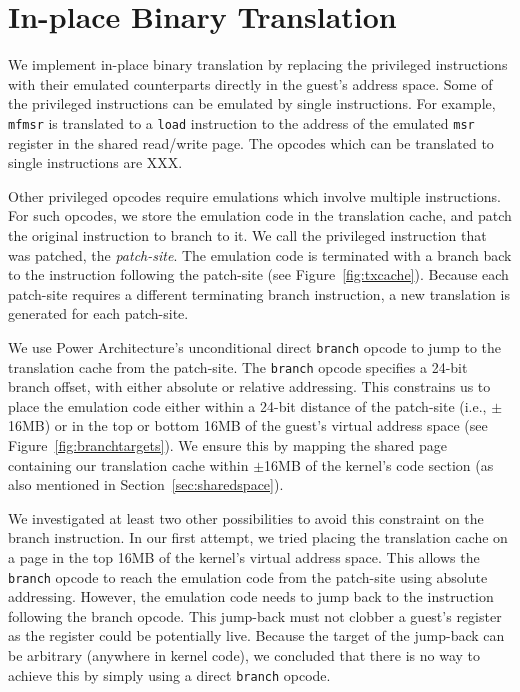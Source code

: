 \documentclass[10pt,twocolumn]{article}
\begin{document}
\section{In-place Binary Translation}
\label{sec:bintrans}
We implement in-place binary translation by replacing the
privileged instructions
with their emulated counterparts directly
in the guest's address space. Some of the privileged instructions can
be emulated by single instructions. For example, {\tt mfmsr} is translated
to a {\tt load} instruction to the address of the emulated {\tt msr}
register in the shared read/write page. The opcodes which can be
translated to single instructions are XXX.

Other privileged opcodes require emulations which involve multiple instructions.
For such opcodes, we store the emulation code in the translation cache, and
patch the original instruction to branch to it. We call the privileged instruction
that was patched, the {\em patch-site}. The emulation code is terminated
with a branch back to the instruction following the patch-site
(see Figure~\ref{fig:txcache}). Because each patch-site requires a different
terminating branch instruction, a new translation is generated for
each patch-site.

We use Power Architecture's unconditional direct {\tt branch} opcode to jump to the
translation cache from the patch-site. The {\tt branch} opcode specifies a 24-bit
branch offset, with either absolute or relative addressing. This constrains us
to place the emulation code either within a 24-bit distance of the patch-site (i.e.,
$\pm$16MB) or in the top or bottom 16MB of the guest's virtual address
space (see Figure~\ref{fig:branchtargets}). We ensure this by mapping the shared
page containing our translation cache within $\pm$16MB of the kernel's code
section (as also mentioned in Section~\ref{sec:sharedspace}).

We investigated at least two other possibilities to avoid this constraint
on the branch instruction. In our first attempt, we tried placing the
translation cache on a page in the top 16MB of the kernel's virtual address
space. This allows the {\tt branch} opcode to reach the emulation code from
the patch-site using absolute addressing. However, the emulation code needs to
jump back to the instruction following the branch opcode. This jump-back must not
clobber a guest's register as the register could be potentially live. Because
the target of the jump-back can be arbitrary (anywhere in kernel code), we concluded
that there is no way to achieve this by simply using a direct {\tt branch} opcode.
\end{document}
